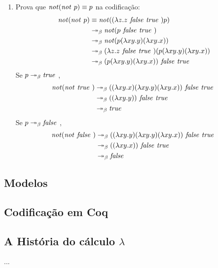 \documentclass[../main.tex]{subfiles}
\begin{document}
\begin{enumerate}
    \item Prova que $\text{\emph{not}}(\text{\emph{not }} p)\equiv p$ na codificação:
    \begin{equation*}
        \begin{split}
            \text{\emph{not}}(\text{\emph{not }} p) & \equiv \text{\emph{not}}((\lambda z . z \text{\emph{ false }} \text{\emph{true }}) p)
                                   \\ & \twoheadrightarrow_{\beta} \text{\emph{not}}(p \text{\emph{ false }} \text{\emph{true }})
                                   \\ & \twoheadrightarrow_{\beta} \text{\emph{not}}(p (\lambda xy . y) (\lambda xy . x))
                                   \\ & \twoheadrightarrow_{\beta} (\lambda z . z \text{\emph{ false }} \text{\emph{true }})(p (\lambda xy . y) (\lambda xy . x))
                                   \\ & \twoheadrightarrow_{\beta} (p (\lambda xy . y) (\lambda xy . x)) \text{\emph{ false }} \text{\emph{true }}
        \end{split}
    \end{equation*}
    Se $p \twoheadrightarrow_{\beta} \text{\emph{true }}$,
    \begin{equation*}
        \begin{split}
            \text{\emph{not}}(\text{\emph{not }} \text{\emph{true }}) & \twoheadrightarrow_{\beta} ((\lambda xy . x) (\lambda xy . y) (\lambda xy . x)) \text{\emph{ false }} \text{\emph{true }} \\ & \twoheadrightarrow_{\beta} ((\lambda xy . y)) \text{\emph{ false }} \text{\emph{true }} \\ & \twoheadrightarrow_{\beta} \text{\emph{true }}
        \end{split}
    \end{equation*}
    Se $p \twoheadrightarrow_{\beta} \text{\emph{false }}$,
    \begin{equation*}
        \begin{split}
            \text{\emph{not}}(\text{\emph{not }} \text{\emph{false }}) & \twoheadrightarrow_{\beta} ((\lambda xy . y) (\lambda xy . y) (\lambda xy . x)) \text{\emph{ false }} \text{\emph{true }} \\ & \twoheadrightarrow_{\beta} ((\lambda xy . x)) \text{\emph{ false }} \text{\emph{true }} \\ & \twoheadrightarrow_{\beta} \text{\emph{false }}
        \end{split}
    \end{equation*}
\end{enumerate}

\subsection{Modelos}

\subsection{Codificação em Coq}

\subsection[A História do Cálculo Lambda]{A História do cálculo $\lambda$}
...
\end{document}
